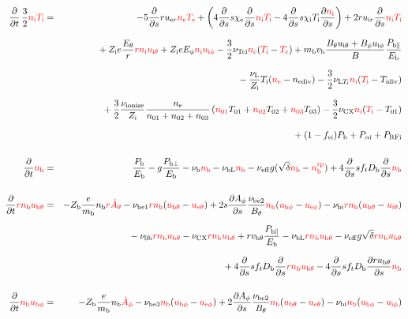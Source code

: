 \documentclass[11pt]{article}
\def\r#1{{\rm#1}}
\def\ddt{\frac{\partial}{\partial t}}
\def\dds{\frac{\partial}{\partial s}}
\def\dd#1{\frac{\partial #1}{\partial s}}
\def\mb{m_\r{b}}
\def\chie{\chi_\r{e}}
\def\chii{\chi_\r{i}}
\def\nee{n_\r{e}}
\def\ni{n_\r{i}}
\def\nb{n_\r{b}}
\def\uer{u_{\r{e}r}}
\def\uir{u_{\r{i}r}}
\def\ueth{u_{\r{e}\theta}}
\def\uith{u_{\r{i}\theta}}
\def\ubth{u_{\r{b}\theta}}
\def\ueph{u_{\r{e}\phi}}
\def\uiph{u_{\r{i}\phi}}
\def\ubph{u_{\r{b}\phi}}
\def\Eth{E_\theta}
\def\Eph{E_\phi}
\def\Bth{B_\theta}
\def\Bph{B_\phi}
\def\Athd{\dot{A}_\theta}
\def\Aphd{\dot{A}_\phi}
\def\Aph{A_\phi}
\def\Te{T_\r{e}}
\def\Ti{T_\r{i}}
\def\nna{n_{01}}
\def\nnb{n_{02}}
\def\nnc{n_{03}}
\def\Zi{Z_\r{i}}
\def\Zb{Z_\r{b}}
\def\Pb{P_\r{b}}
\def\Eb{E_\r{b}}
\def\PRFi{P_\r{RFi}}
\def\Tna{T_{01}}
\def\Tnb{T_{02}}
\def\Tnc{T_{03}}
\def\fei{f_\r{ei}}
\def\nbrp{n_\r{b}^\r{rp}}
\def\Pbpara{P_{\r{b}\parallel}}
\def\Pbperp{P_{\r{b}\perp}}
\def\nueff{\nu_\r{eff}}
\def\Db{D_\r{b}}
\def\Palpi{P_{\alpha\r{i}}}
\def\nuNCi{\nu_\r{NCi}}
\def\nubi{\nu_\r{bi}}
\def\nunb{\nu_\r{0b}}
\def\nuL{\nu_\r{L}}
\def\nuCX{\nu_\r{CX}}
\def\nuion{\nu_\r{ionize}}
\def\nub{\nu_\r{b}}
\def\nuTei{\nu_\r{Tei}}
\def\vb{v_\r{b}}
\def\nediv{n_\r{ediv}}
\def\Tidiv{T_\r{idiv}}
\def\nuLTi{\nu_{\r{L}T_\r{i}}}
\def\nubL{\nu_\r{bL}}
\def\vbth{v_{\r{b}\theta}}
\def\red#1{\textcolor{red}{#1}}
\begin{document}
\begin{eqnarray}
%
\\[5mm]
  \ddt \, \frac{3}{2} \red{\ni \Ti} &=&
%
  - 5 \dds r \uer \red{\nee \Te}
%
  + \left(   4 \dds s \chie \dds \red{\ni \Ti} 
%
           - 4 \dds s \chii \Ti \dd{\red{\ni}} \right)
%
  + 2 r \uir \dds \red{\ni \Ti}
%
\nonumber\\[2.5mm]&&{}
%
  + \Zi e \frac{\Eth}{r} \red{r \ni \uith}
%
  + \Zi e \Eph \red{\ni \uiph}
%
  - \frac{3}{2} \nuTei \red{\nee} (\red{\Ti} - \red{\Te})
%
  + \mb \vb \frac{\Bth \uith + \Bph \uiph}{B} \frac{\Pbpara}{\Eb}  
\nonumber\\[2.5mm]&&{}
%
  - \frac{\nuL}{\Zi} \Ti (\red{\nee} - \nediv)
%
  - \frac{3}{2} \nuLTi \red{\ni} (\red{\Ti} - \Tidiv)
\nonumber\\[2.5mm]&&{}
%
  + \frac{3}{2} \frac{\nuion}{\Zi} \frac{\nee}{\nna + \nnb + \nnc}\, (\red{\nna} \Tna +
  \red{\nnb} \Tnb + \red{\nnc} \Tnc)
%
  - \frac{3}{2} \nuCX \red{\ni} (\red{\Ti} - \Tna)
\nonumber\\[2.5mm]&&{}
%
  + (1 - \fei) \Pb
%
  + \Palpi
%
  + \PRFi
\\[5mm]
  \ddt \red{\nb} &=&
%
    \frac{\Pb}{\Eb}
%
  - g \frac{\Pbperp}{\Eb}
%
  - \nub \red{\nb}
%
  - \nubL \red{\nb}
%
  - \nueff g (\sqrt{\delta}\red{\nb} - \red{\nbrp})
%
  + 4 \dds s f_t \Db \dds \red{\nb}
\\[5mm]
  \ddt \red{r \nb \ubth} &=&
%
  - \Zb \frac{e}{\mb} \nb \red{r \Athd}
%
%
  - \nu_\r{be1} \red{r \nb} (\red{\ubth} - \red{\ueth})
%
  + 2 s \dd{\Aph} \frac{\nu_\r{be2}}{\Bth} \red{\nb} (\red{\ubph} - \red{\ueph})
%
  - \nubi \red{r \nb} (\red{\ubth} - \red{\uith})
\nonumber\\[2.5mm]&&{}
%
  - \nunb \red{r \nb \ubth}
%
  - \nuCX \red{r \nb \ubth}
%
  + r \vbth \frac{\Pbpara}{\Eb}
%
  - \nubL \red{r \nb \ubth}
%
  - \nueff g \sqrt{\delta} \red{r \nb \ubth}
\nonumber\\[2.5mm]&&{}
%
  + 4 \dds s f_t \Db \dds \red{r \nb \ubth}
%
  - 4 \dds s f_t \Db \dd{r\ubth} \red{\nb}
\\[5mm]
  \ddt \red{\nb \ubph} &=&
%
  - \Zb \frac{e}{\mb} \nb \red{\Aphd}
%
  - \nu_\r{be3} \red{\nb} (\red{\ubph} - \red{\ueph})
%
  + 2 \dd{\Aph} \frac{\nu_\r{be2}}{\Bth} \red{\nb} (\red{\ubth} - \red{\ueth})
%
  - \nubi \red{\nb} (\red{\ubph} - \red{\uiph})

\end{eqnarray}
\end{document}
